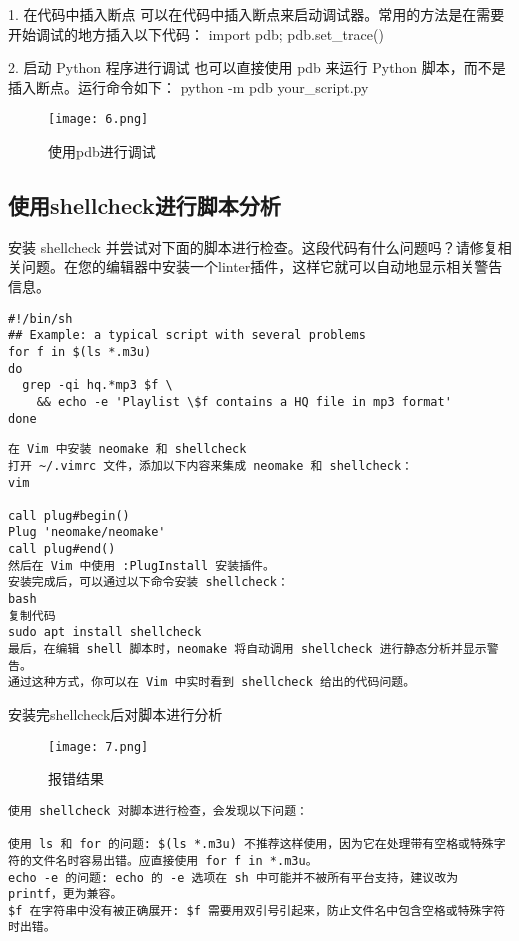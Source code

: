 \documentclass[a4paper, 12pt]{article}
\begin{document}
1. 在代码中插入断点
可以在代码中插入断点来启动调试器。常用的方法是在需要开始调试的地方插入以下代码：
import pdb; pdb.set\_trace()

2. 启动 Python 程序进行调试
也可以直接使用 pdb 来运行 Python 脚本，而不是插入断点。运行命令如下：
python -m pdb your\_script.py

\begin{figure}[H]
  \centering
    \texttt{[image: 6.png]}
  \caption{使用pdb进行调试}
   \end{figure}
   

\subsection{使用shellcheck进行脚本分析}  

安装 shellcheck 并尝试对下面的脚本进行检查。这段代码有什么问题吗？请修复相关问题。在您的编辑器中安装一个linter插件，这样它就可以自动地显示相关警告信息。
\begin{lstlisting}
#!/bin/sh
## Example: a typical script with several problems
for f in $(ls *.m3u)
do
  grep -qi hq.*mp3 $f \
    && echo -e 'Playlist \$f contains a HQ file in mp3 format'
done
\end{lstlisting}
\begin{lstlisting}
在 Vim 中安装 neomake 和 shellcheck
打开 ~/.vimrc 文件，添加以下内容来集成 neomake 和 shellcheck：
vim

call plug#begin()
Plug 'neomake/neomake'
call plug#end()
然后在 Vim 中使用 :PlugInstall 安装插件。
安装完成后，可以通过以下命令安装 shellcheck：
bash
复制代码
sudo apt install shellcheck
最后，在编辑 shell 脚本时，neomake 将自动调用 shellcheck 进行静态分析并显示警告。
通过这种方式，你可以在 Vim 中实时看到 shellcheck 给出的代码问题。
\end{lstlisting}

安装完shellcheck后对脚本进行分析

\begin{figure}[H]
  \centering
    \texttt{[image: 7.png]}
  \caption{报错结果}
   \end{figure}

\begin{lstlisting}
使用 shellcheck 对脚本进行检查，会发现以下问题：

使用 ls 和 for 的问题: $(ls *.m3u) 不推荐这样使用，因为它在处理带有空格或特殊字符的文件名时容易出错。应直接使用 for f in *.m3u。
echo -e 的问题: echo 的 -e 选项在 sh 中可能并不被所有平台支持，建议改为 printf，更为兼容。
$f 在字符串中没有被正确展开: $f 需要用双引号引起来，防止文件名中包含空格或特殊字符时出错。
\end{lstlisting}
\end{document}

